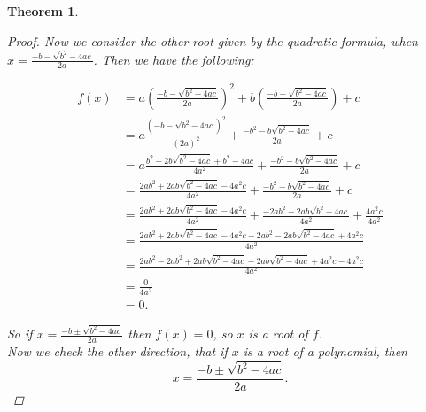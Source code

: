 \documentclass[12pt, letterpaper]{article}
\newtheorem{thm}{Theorem}[section]
\theoremstyle{definition}
\begin{document}
\begin{thm}
\begin{proof}
        Now we consider the other root given by the quadratic formula, when
        \(x = \frac{-b - \sqrt{b^2 - 4 a c}}{2a}\).
        Then we have the following:

        \begin{align*}
        f(x) &= a \left(\frac{-b - \sqrt{b^2 - 4 a c}}{2a}\right)^2
                + b \left(\frac{-b - \sqrt{b^2 - 4 a c}}{2a}\right) + c \\
             &= a \frac{\left(-b - \sqrt{b^2 - 4 a c}\right)^2}{\left(2a\right)^2}
                + \frac{-b^2 - b\sqrt{b^2 - 4 a c}}{2a} + c \\
             &= a \frac{b^2 + 2b \sqrt{b^2 - 4 a c} + b^2 - 4 a c}{4a^2}
                + \frac{-b^2 - b\sqrt{b^2 - 4 a c}}{2a} + c \\
             &= \frac{2 a b^2 + 2ab \sqrt{b^2 - 4 a c} - 4 a^2 c}{4a^2}
                + \frac{-b^2 - b\sqrt{b^2 - 4 a c}}{2a} + c \\
             &= \frac{2 a b^2 + 2ab \sqrt{b^2 - 4 a c} - 4 a^2 c}{4a^2}
             + \frac{-2ab^2 - 2ab\sqrt{b^2 - 4 a c}}{4a^2} + \frac{4a^2c}{4a^2} \\
             &= \frac{2 a b^2 + 2ab \sqrt{b^2 - 4 a c} - 4 a^2 c
                -2ab^2 - 2ab\sqrt{b^2 - 4 a c} + 4a^2c}{4a^2} \\
             &= \frac{2 a b^2 -2ab^2 + 2ab\sqrt{b^2 - 4 a c} - 2ab \sqrt{b^2 - 4 a c}
                + 4a^2c  - 4 a^2 c}{4a^2} \\
             &= \frac{0}{4a^2} \\
             &= 0.
        \end{align*}

        So if \(x = \frac{-b \pm \sqrt{b^2 - 4 a c}}{2a}\)
        then \(f(x) = 0\), so \(x\) is a root of \(f\). \\

        Now we check the other direction, that if \(x\) is a root of a polynomial,
        then \[x = \frac{-b \pm \sqrt{b^2 - 4 a c}}{2a}.\]


\end{proof}
\end{thm}
\end{document}
